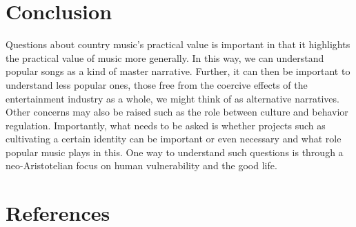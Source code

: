 \documentclass[12pt]{book}
\theoremstyle{definition}
\theoremstyle{remark}
\begin{document}
\chapter{Conclusion}\label{conclusion-1}

Questions about country music's practical value is important in that it highlights the practical value of music more generally. In this way, we can understand popular songs as a kind of master narrative. Further, it can then be important to understand less popular ones, those free from the coercive effects of the entertainment industry as a whole, we might think of as alternative narratives. Other concerns may also be raised such as the role between culture and behavior regulation. Importantly, what needs to be asked is whether projects such as cultivating a certain identity can be important or even necessary and what role popular music plays in this. One way to understand such questions is through a neo-Aristotelian focus on human vulnerability and the good life.

\chapter{References}\label{references}
\end{document}
